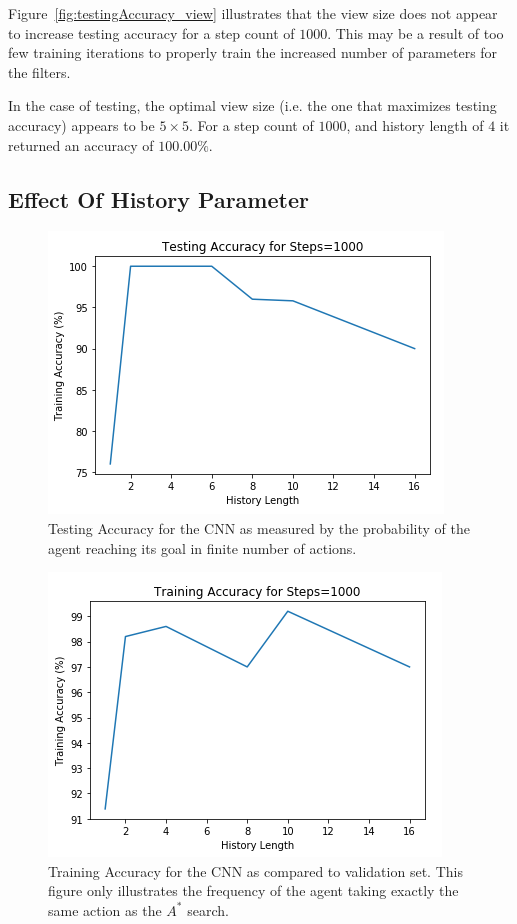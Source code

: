 \documentclass{article}
\begin{document}
Figure~\ref{fig:testingAccuracy_view} illustrates that the view size does not appear to increase testing accuracy for a step count of $1000$. This may be a result of too few training iterations to properly train the increased number of parameters for the filters.

In the case of testing, the optimal view size (i.e. the one that maximizes testing accuracy) appears to be $5\times5$. For a step count of $1000$, and history length of $4$ it returned an accuracy of $100.00\%$.

\subsection{Effect Of History Parameter}

\begin{figure}[ht]
\centering
  \includegraphics[width=0.6\linewidth]{testingAccuracy}
  \caption{Testing Accuracy for the CNN as measured by the probability of the agent reaching its goal in finite number of actions.}
  \label{fig:testingAccuracy}
\end{figure}

\begin{figure}[ht]
\centering
  \includegraphics[width=0.6\linewidth]{trainingAccuracy}
  \caption{Training Accuracy for the CNN as compared to validation set. This figure only illustrates the frequency of the agent taking exactly the same action as the $A^{*}$ search.}
  \label{fig:trainingAccuracy}
\end{figure}
\end{document}
